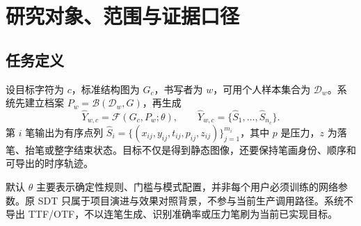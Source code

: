 \documentclass[UTF8,a4paper,11pt,fontset=fandol]{ctexart}
\begin{document}
\begin{abstract}
InkStruct 面向有限个人在线笔迹样本下的汉字轨迹生成，将内容约束交给标准字符结构，将个性化几何交给书写者档案，并将生成轨迹作为后续页面排版与人工审校的不可变资产。当前生产默认是确定性的 ComponentTrajectory v4 adaptive：先建立版本化字符图，再对采集笔画进行保守的全局笔顺匹配，抽取整字风格、部件布局、条件化笔画残差和共享局部坐标系中的完整部件原型；生成时依据信息支持程度选择整组部件轨迹或分层回退，最后以端点填充三次 B 样条和弧长重采样得到在线点序列。系统另实现可选分层 Transformer 残差模型、完整源轨迹供体迁移、保护折钩的有界简化、标准结构审计、局部几何修正与多类布局风险实验。本文逐项说明实际数据结构、公式、阈值、控制流、版本绑定、误差指标和已知边界，特别区分标准笔画身份保持、几何交叉约束、源轨迹保真与感知质量。文档层采用原始文本区间、不可变字形资源、页面布局快照和共享绘制操作；审校评价绑定字形字节哈希，并通过异步请求版本、原子保存和导出诊断门槛维持一致性。历史固定折实验中，v4 的 DTW 为 0.036816，强制 v5 为 0.048835，安全 v5 全部回退到 v4；这些证据支持保留默认生成路径，但不足以证明广泛的跨作者风格泛化。本次工作区测试为 200 项通过、4 项跳过，未重新执行历史 GPU 训练或私有数据实验。

\textbf{关键词：}汉字结构先验；在线手写轨迹；部件原型；笔顺匹配；源轨迹保真；分层残差模型；页面排版；可追溯审校
\end{abstract}
\clearpage
\tableofcontents
\clearpage
{}

\section{研究对象、范围与证据口径}
\subsection{任务定义}
设目标字符为 $c$，标准结构图为 $G_c$，书写者为 $w$，可用个人样本集合为 $\mathcal{D}_w$。系统先建立档案 $P_w=\mathcal{B}(\mathcal{D}_w,G)$，再生成
\begin{equation}
\widehat{Y}_{w,c}=\mathcal{F}(G_c,P_w;\theta),\qquad
\widehat{Y}_{w,c}=\{\widehat{S}_1,\ldots,\widehat{S}_{n_c}\}.
\end{equation}
第 $i$ 笔输出为有序点列 $\widehat{S}_i=\{(x_{ij},y_{ij},t_{ij},p_{ij},z_{ij})\}_{j=1}^{m_i}$，其中 $p$ 是压力，$z$ 为落笔、抬笔或整字结束状态。目标不仅是得到静态图像，还要保持笔画身份、顺序和可导出的时序轨迹。

默认 $\theta$ 主要表示确定性规则、门槛与模式配置，并非每个用户必须训练的网络参数。原 SDT 只属于项目演进与效果对照背景，不参与当前生产调用路径。系统不导出 TTF/OTF，不以连笔生成、识别准确率或压力笔刷为当前已实现目标\cite{repo-main,repo-arch}。
\end{document}
